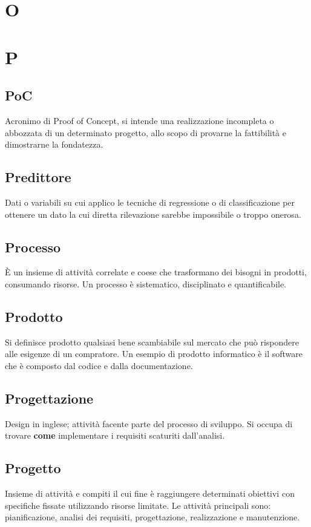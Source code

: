 \clearpage
\section*{O}

\clearpage
\section*{P}

\subsection*{PoC}
Acronimo di Proof of Concept, si intende una realizzazione incompleta o abbozzata di un determinato progetto, allo scopo di provarne la fattibilità e dimostrarne la fondatezza.

\subsection*{Predittore}
Dati o variabili su cui applico le tecniche di regressione o di classificazione per ottenere un dato la cui diretta rilevazione sarebbe impossibile o troppo onerosa.

\subsection*{Processo}
È un insieme di attività correlate e coese che trasformano dei bisogni in prodotti, consumando risorse. Un processo è sistematico, disciplinato e quantificabile.

\subsection*{Prodotto}
Si definisce prodotto qualsiasi bene scambiabile sul mercato che può rispondere alle esigenze di un compratore. Un esempio di prodotto informatico è il software che è composto dal codice e dalla documentazione.

\subsection*{Progettazione}
Design in inglese; attività facente parte del processo di sviluppo. Si occupa di trovare \textbf{come} implementare i requisiti scaturiti dall'analisi.

\subsection*{Progetto}
Insieme di attività e compiti il cui fine è raggiungere determinati obiettivi con specifiche fissate utilizzando risorse limitate. Le attività principali sono: pianificazione, analisi dei requisiti, progettazione, realizzazione e manutenzione.

